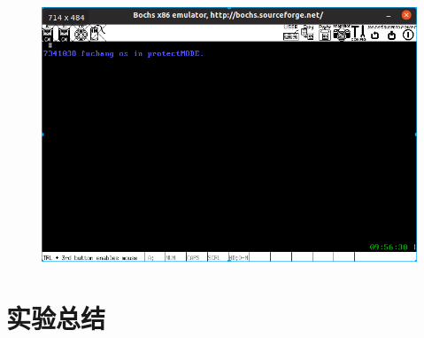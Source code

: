\documentclass[a4paper,11pt,UTF8]{ctexart}
\newcommand{\bottomcaption}{%
\setlength{\abovecaptionskip}{6pt}%
\setlength{\belowcaptionskip}{6pt}%
\caption}
\begin{document}
	\begin{figure}[htbp]
		\centering
		\includegraphics[width=15cm]{expr_image/DeepinScrot-5546.png}
		\bottomcaption{}
	\end{figure}
\section{实验总结}




\clearpage
\end{document}
